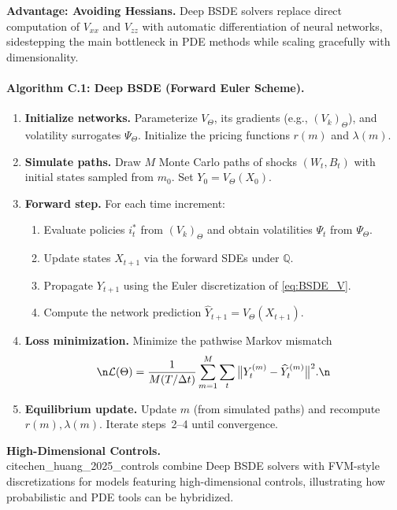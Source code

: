 \documentclass[11pt,letterpaper,oneside]{article}
\begin{document}
\begin{tcolorbox}[didacticstyle]
\textbf{Advantage: Avoiding Hessians.} Deep BSDE solvers replace direct computation of $V_{xx}$ and $V_{zz}$ with automatic differentiation of neural networks, sidestepping the main bottleneck in PDE methods while scaling gracefully with dimensionality.
\end{tcolorbox}

\paragraph{Algorithm C.1: Deep BSDE (Forward Euler Scheme).}
\begin{enumerate}[leftmargin=1.5em,label=\textbf{C.\arabic*}]
\item \textbf{Initialize networks.} Parameterize $V_\Theta$, its gradients (e.g., $(V_k)_\Theta$), and volatility surrogates $\Psi_\Theta$. Initialize the pricing functions $r(m)$ and $\lambda(m)$.
\item \textbf{Simulate paths.} Draw $M$ Monte Carlo paths of shocks $(W_t, B_t)$ with initial states sampled from $m_0$. Set $Y_0 = V_\Theta(X_0)$.
\item \textbf{Forward step.} For each time increment:\n\begin{enumerate}[label=\alph*.]
\item Evaluate policies $i_t^*$ from $(V_k)_\Theta$ and obtain volatilities $\Psi_t$ from $\Psi_\Theta$.
\item Update states $X_{t+1}$ via the forward SDEs under $\mathbb{Q}$.
\item Propagate $Y_{t+1}$ using the Euler discretization of \eqref{eq:BSDE_V}.
\item Compute the network prediction $\widehat{Y}_{t+1} = V_\Theta(X_{t+1})$.
\end{enumerate}
\item \textbf{Loss minimization.} Minimize the pathwise Markov mismatch\n\[\n\mathcal{L}(\Theta) = \frac{1}{M(T/\Delta t)}\sum_{m=1}^M \sum_t \big\| Y_t^{(m)} - \widehat{Y}_t^{(m)} \big\|^2.\n\]\n\item \textbf{Equilibrium update.} Update $m$ (from simulated paths) and recompute $r(m), \lambda(m)$. Iterate steps~2--4 until convergence.\n\end{enumerate}\n\n\begin{tcolorbox}[literaturestyle]\n\textbf{High-Dimensional Controls.} \\cite{chen_huang_2025_controls} combine Deep BSDE solvers with FVM-style discretizations for models featuring high-dimensional controls, illustrating how probabilistic and PDE tools can be hybridized.\n\end{tcolorbox}\n\n%
\end{document}
